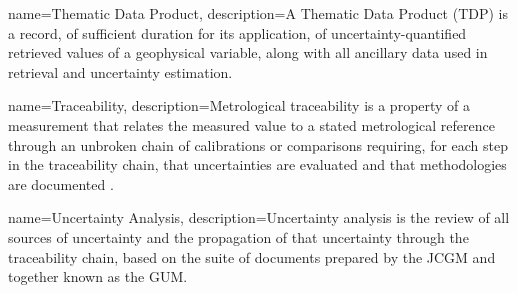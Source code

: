 {name={Thematic Data Product},
description={A Thematic Data Product (TDP) is a record, of sufficient duration for its
application, of uncertainty-quantified retrieved values of a geophysical variable,
along with all ancillary data used in retrieval and uncertainty estimation.}}

{name={Traceability},
description={Metrological traceability is a property of a measurement that relates the measured value to a stated metrological reference through an unbroken chain of calibrations or comparisons requiring, for each step in the traceability chain, that uncertainties are evaluated and that methodologies are documented \cite{QA4EO2}.}}

{name={Uncertainty Analysis},
description={Uncertainty analysis is the review of all sources of uncertainty and the propagation of that uncertainty through the traceability chain, based on the suite of documents prepared by the \ac{JCGM} and together known as the \ac{GUM}.}}



